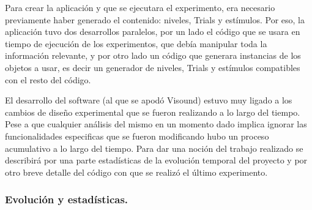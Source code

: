 \documentclass{article}
\numberwithin{figure}{section}
\begin{document}
    Para crear la aplicación y que se ejecutara el experimento, era necesario previamente haber generado el contenido: niveles, Trials y estímulos. Por eso, la aplicación tuvo dos desarrollos paralelos, por un lado el código que se usara en tiempo de ejecución de los experimentos, que debía manipular toda la información relevante, y por otro lado un código que generara instancias de los objetos a usar, es decir un generador de niveles, Trials y estímulos compatibles con el resto del código.
    
    El desarrollo del software (al que se apodó Visound) estuvo muy ligado a los cambios de diseño experimental que se fueron realizando a lo largo del tiempo. Pese a que cualquier análisis del mismo en un momento dado implica ignorar las funcionalidades especificas que se fueron modificando hubo un proceso acumulativo a lo largo del tiempo. Para dar una noción del trabajo realizado se describirá por una parte estadísticas de la evolución temporal del proyecto y por otro breve detalle del código con que se realizó el último experimento. 
    
    \subsubsection{Evolución y estadísticas.}
    
\end{document}
